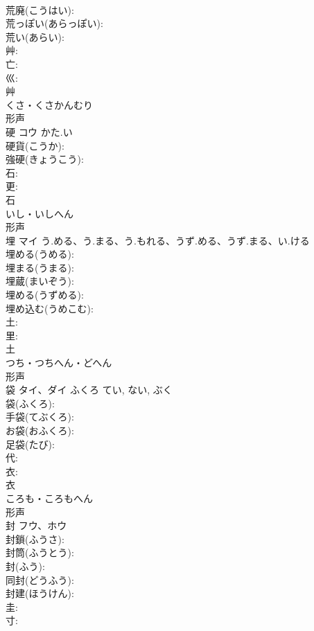 \documentclass[8pt]{extreport}
\begin{document}
\begin{CJK}{UTF8}{min}
\\	荒廃(こうはい): 
\\	荒っぽい(あらっぽい): 
\\	荒い(あらい): 
\\	艸: 
\\	亡: 
\\	巛: 
\\	艸	
\\	くさ・くさかんむり	
\\	形声 
\\	硬	コウ	かた.い		
\\	硬貨(こうか): 
\\	強硬(きょうこう): 
\\	石: 
\\	更: 
\\	石	
\\	いし・いしへん	
\\	形声 
\\	埋	マイ	う.める、う.まる、う.もれる、うず.める、うず.まる、い.ける		
\\	埋める(うめる): 
\\	埋まる(うまる): 
\\	埋蔵(まいぞう): 
\\	埋める(うずめる): 
\\	埋め込む(うめこむ): 
\\	土: 
\\	里: 
\\	土	
\\	つち・つちへん・どへん	
\\	形声 
\\	袋	タイ、ダイ	ふくろ	てい, ない, ぶく	
\\	袋(ふくろ): 
\\	手袋(てぶくろ): 
\\	お袋(おふくろ): 
\\	足袋(たび): 
\\	代: 
\\	衣: 
\\	衣	
\\	ころも・ころもへん	
\\	形声 
\\	封	フウ、ホウ			
\\	封鎖(ふうさ): 
\\	封筒(ふうとう): 
\\	封(ふう): 
\\	同封(どうふう): 
\\	封建(ほうけん): 
\\	圭: 
\\	寸: 

\end{CJK}
\end{document}
